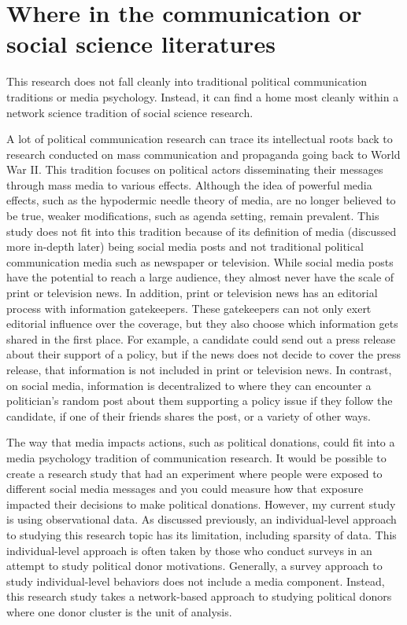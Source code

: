 \documentclass[12pt,]{article}
\begin{document}
\hypertarget{where-in-the-communication-or-social-science-literatures}{%
\section{Where in the communication or social science
literatures}\label{where-in-the-communication-or-social-science-literatures}}

This research does not fall cleanly into traditional political
communication traditions or media psychology. Instead, it can find a
home most cleanly within a network science tradition of social science
research.

A lot of political communication research can trace its intellectual
roots back to research conducted on mass communication and propaganda
going back to World War II. This tradition focuses on political actors
disseminating their messages through mass media to various effects.
Although the idea of powerful media effects, such as the hypodermic
needle theory of media, are no longer believed to be true, weaker
modifications, such as agenda setting, remain prevalent. This study does
not fit into this tradition because of its definition of media
(discussed more in-depth later) being social media posts and not
traditional political communication media such as newspaper or
television. While social media posts have the potential to reach a large
audience, they almost never have the scale of print or television news.
In addition, print or television news has an editorial process with
information gatekeepers. These gatekeepers can not only exert editorial
influence over the coverage, but they also choose which information gets
shared in the first place. For example, a candidate could send out a
press release about their support of a policy, but if the news does not
decide to cover the press release, that information is not included in
print or television news. In contrast, on social media, information is
decentralized to where they can encounter a politician's random post
about them supporting a policy issue if they follow the candidate, if
one of their friends shares the post, or a variety of other ways.

The way that media impacts actions, such as political donations, could
fit into a media psychology tradition of communication research. It
would be possible to create a research study that had an experiment
where people were exposed to different social media messages and you
could measure how that exposure impacted their decisions to make
political donations. However, my current study is using observational
data. As discussed previously, an individual-level approach to studying
this research topic has its limitation, including sparsity of data. This
individual-level approach is often taken by those who conduct surveys in
an attempt to study political donor motivations. Generally, a survey
approach to study individual-level behaviors does not include a media
component. Instead, this research study takes a network-based approach
to studying political donors where one donor cluster is the unit of
analysis.
\end{document}
